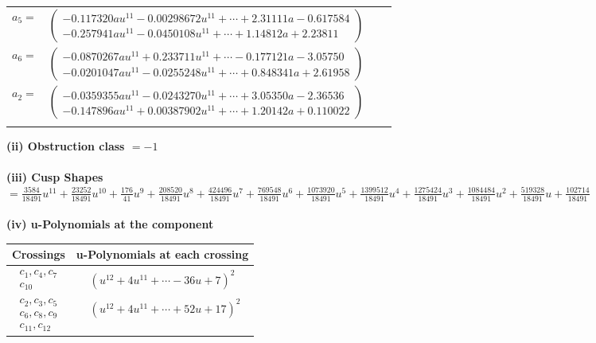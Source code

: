 \documentclass[1p]{elsarticle_modified}
\theoremstyle{definition}
\begin{document}
\begin{tabular}{m{7pt} m{180pt} m{7pt} m{180pt} }
\flushright $a_{5}=$&$\begin{pmatrix}-0.117320 a u^{11}-0.00298672 u^{11}+\cdots+2.31111 a-0.617584\\-0.257941 a u^{11}-0.0450108 u^{11}+\cdots+1.14812 a+2.23811\end{pmatrix}$ \\
\flushright $a_{6}=$&$\begin{pmatrix}-0.0870267 a u^{11}+0.233711 u^{11}+\cdots-0.177121 a-3.05750\\-0.0201047 a u^{11}-0.0255248 u^{11}+\cdots+0.848341 a+2.61958\end{pmatrix}$ \\
\flushright $a_{2}=$&$\begin{pmatrix}-0.0359355 a u^{11}-0.0243270 u^{11}+\cdots+3.05350 a-2.36536\\-0.147896 a u^{11}+0.00387902 u^{11}+\cdots+1.20142 a+0.110022\end{pmatrix}$\\&\end{tabular}
\flushleft \textbf{(ii) Obstruction class $= -1$}\\~\\
\flushleft \textbf{(iii) Cusp Shapes $= \frac{3584}{18491} u^{11}+\frac{23252}{18491} u^{10}+\frac{176}{41} u^9+\frac{208520}{18491} u^8+\frac{424496}{18491} u^7+\frac{769548}{18491} u^6+\frac{1073920}{18491} u^5+\frac{1399512}{18491} u^4+\frac{1275424}{18491} u^3+\frac{1084484}{18491} u^2+\frac{519328}{18491} u+\frac{102714}{18491}$}\\~\\
\newpage\renewcommand{\arraystretch}{1}
\flushleft \textbf{(iv) u-Polynomials at the component}\newline \\
\begin{tabular}{m{50pt}|m{274pt}}
Crossings & \hspace{64pt}u-Polynomials at each crossing \\
\hline $$\begin{aligned}c_{1},c_{4},c_{7}\\c_{10}\end{aligned}$$&$\begin{aligned}
&(u^{12}+4 u^{11}+\cdots-36 u+7)^{2}
\end{aligned}$\\
\hline $$\begin{aligned}c_{2},c_{3},c_{5}\\c_{6},c_{8},c_{9}\\c_{11},c_{12}\end{aligned}$$&$\begin{aligned}
&(u^{12}+4 u^{11}+\cdots+52 u+17)^{2}
\end{aligned}$\\
\hline
\end{tabular}\\~\\
\end{document}
